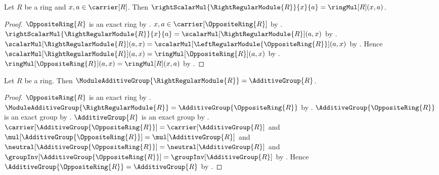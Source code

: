 \begin{proposition}\label{right_regular_scalar_apply}
    Let $R$ be a ring and $x,a\in\carrier[R]$.
    Then
        $\rightScalarMul{\RightRegularModule{R}}{x}{a}
            =\ringMul[R](x,a)$.
\end{proposition}
\begin{proof}
    $\OppositeRing{R}$ is an exact ring by
        .
    $x,a\in\carrier[\OppositeRing{R}]$ by
        .
    $\rightScalarMul{\RightRegularModule{R}}{x}{a}
        =\scalarMul[\RightRegularModule{R}](a,x)$ by
        .
    $\scalarMul[\RightRegularModule{R}](a,x)
        =\scalarMul[\LeftRegularModule{\OppositeRing{R}}](a,x)$ by
        .
    Hence $\scalarMul[\RightRegularModule{R}](a,x)
        =\ringMul[\OppositeRing{R}](a,x)$ by
        .
    $\ringMul[\OppositeRing{R}](a,x)=\ringMul[R](x,a)$ by
        .
\end{proof}

\begin{theorem}\label{right_regular_module_additive_group}
    Let $R$ be a ring.
    Then
        $\ModuleAdditiveGroup{\RightRegularModule{R}}
            =\AdditiveGroup{R}$.
\end{theorem}
\begin{proof}
    $\OppositeRing{R}$ is an exact ring by
        .
    $\ModuleAdditiveGroup{\RightRegularModule{R}}
        =\AdditiveGroup{\OppositeRing{R}}$ by
        .
    $\AdditiveGroup{\OppositeRing{R}}$ is an exact group by
        .
    $\AdditiveGroup{R}$ is an exact group by
        .
    $\carrier[\AdditiveGroup{\OppositeRing{R}}]
        =\carrier[\AdditiveGroup{R}]$ and
        $\mul[\AdditiveGroup{\OppositeRing{R}}]
        =\mul[\AdditiveGroup{R}]$ and
        $\neutral[\AdditiveGroup{\OppositeRing{R}}]
        =\neutral[\AdditiveGroup{R}]$ and
        $\groupInv[\AdditiveGroup{\OppositeRing{R}}]
        =\groupInv[\AdditiveGroup{R}]$ by
        .
    Hence $\AdditiveGroup{\OppositeRing{R}}=\AdditiveGroup{R}$ by
        .
\end{proof}
